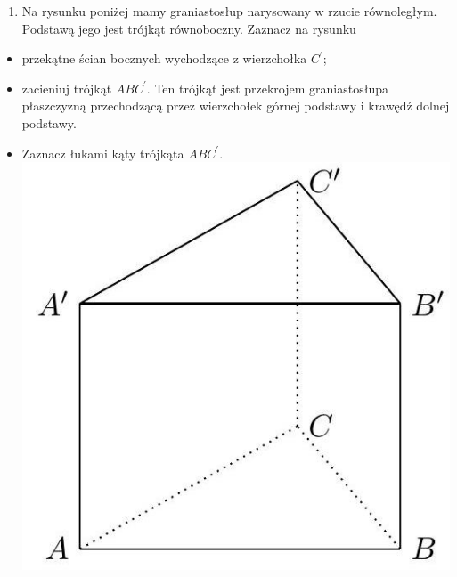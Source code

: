 \documentclass[10pt]{article}
\begin{document}
\begin{enumerate}
  \item Na rysunku poniżej mamy graniastosłup narysowany w rzucie równoległym. Podstawą jego jest trójkąt równoboczny. Zaznacz na rysunku
\end{enumerate}

\begin{itemize}
  \item przekątne ścian bocznych wychodzące z wierzchołka \(C^{\prime}\);
  \item zacieniuj trójkąt \(A B C^{\prime}\). Ten trójkąt jest przekrojem graniastosłupa płaszczyzną przechodzącą przez wierzchołek górnej podstawy i krawędź dolnej podstawy.
  \item Zaznacz łukami kąty trójkąta \(A B C^{\prime}\).\\
\includegraphics[max width=\textwidth, center]{2024_11_21_e9b4faa005d5be2cc318g-077}\\

\end{itemize}
\end{document}
